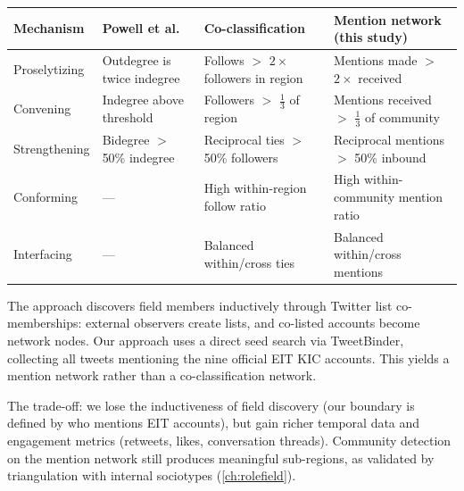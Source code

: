 \documentclass[../main.tex]{subfiles}
\begin{document}
\tableminimal
\begin{center}
\footnotesize
\begin{tabular}{@{}p{2cm}p{2.8cm}p{2.8cm}p{2.8cm}@{}}
\toprule
\textbf{Mechanism} &
\textbf{Powell et al.} &
\textbf{Co-classification} \newline \parencite{benabdelkrim-opening-fields-2020} &
\textbf{Mention network} \newline (this study) \\
\midrule
Proselytizing &
Outdegree is twice indegree &
Follows $>$ $2\times$ followers in region &
Mentions made $>$ $2\times$ received \\[0.5em]
Convening &
Indegree above threshold &
Followers $>$ $\frac{1}{3}$ of region &
Mentions received $>$ $\frac{1}{3}$ of community \\[0.5em]
Strengthening &
Bidegree $>$ 50\% indegree &
Reciprocal ties $>$ 50\% followers &
Reciprocal mentions $>$ 50\% inbound \\[0.5em]
Conforming &
--- &
High within-region follow ratio &
High within-community mention ratio \\[0.5em]
Interfacing &
--- &
Balanced within/cross ties &
Balanced within/cross mentions \\
\bottomrule
\end{tabular}
\label{tab:social-mechanism-ops}
\end{center}

\begin{criticalbox}
The \textcite{benabdelkrim-opening-fields-2020} approach discovers field members
inductively through Twitter list co-memberships: external observers create lists,
and co-listed accounts become network nodes.
Our approach uses a direct seed search via TweetBinder, collecting all tweets
mentioning the nine official EIT KIC accounts.
This yields a mention network rather than a co-classification network.

The trade-off: we lose the inductiveness of field discovery (our boundary is
defined by who mentions EIT accounts), but gain richer temporal data and
engagement metrics (retweets, likes, conversation threads).
Community detection on the mention network still produces meaningful sub-regions,
as validated by triangulation with internal sociotypes (\cref{ch:rolefield}).
\end{criticalbox}


\end{document}
